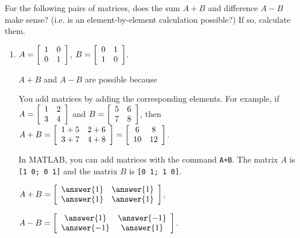 \documentclass{ximera}
\author{Zack Reed}
\begin{document}
\begin{exercise}
    For the following pairs of matrices, does the sum $A+B$ and difference $A-B$ make sense? (i.e. is an element-by-element calculation possible?) If so, calculate them.
    \begin{enumerate}
    \item
      $A = \startmat{cc}
        1 & 0 \\
        0 & 1
      \stopmat$,\quad
      $B = \startmat{cc}
        0 & 1 \\
        1 & 0
      \stopmat$.
  
      
  
        $A+B$ and $A-B$ are  possible because 
  
        \begin{selectAll}
        \end{selectAll}

        \begin{hint}
        
          You add matrices by adding the corresponding elements. For example, if $A = \startmat{cc} 1 & 2 \\ 3 & 4 \stopmat$ and $B = \startmat{cc} 5 & 6 \\ 7 & 8 \stopmat$, then $A+B = \startmat{cc} 1+5 & 2+6 \\ 3+7 & 4+8 \stopmat = \startmat{cc} 6 & 8 \\ 10 & 12 \stopmat$.

          In MATLAB, you can add matrices with the command \texttt{A+B}. The matrix $A$ is \texttt{[1 0; 0 1]} and the matrix $B$ is \texttt{[0 1; 1 0]}.

        \end{hint}
  
        $A+B = \startmat{cc}
          \answer{1} & \answer{1} \\
          \answer{1} & \answer{1}
        \stopmat$,\quad
  
        $A-B = \startmat{cc}
          \answer{1} & \answer{-1} \\
          \answer{-1} & \answer{1}
        \stopmat$.
  

\end{enumerate}
\end{exercise}
\end{document}
